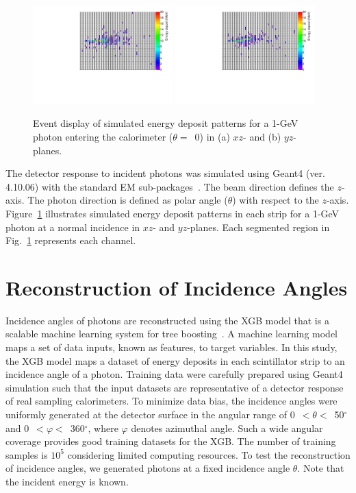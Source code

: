 \documentclass[preprint,12pt,times,a4paper]{elsarticle}
\begin{document}
\begin{figure}[!hbt]
\includegraphics[width=0.48\textwidth]{figures/SingleEventXZHit.pdf}
\includegraphics[width=0.48\textwidth]{figures/SingleEventYZHit.pdf}
\caption{ Event display of simulated energy deposit patterns for a 1-GeV photon entering the calorimeter ($\theta=$~0) in (a) $xz$- and (b) $yz$-planes.}
\label{fig:Evt_Dis}
\end{figure}

The detector response to incident photons was simulated using Geant4 (ver. 4.10.06) with the standard EM sub-packages~\cite{GEANT4}. The beam direction defines the $z$-axis. The photon direction is defined as polar angle ($\theta$) with respect to the $z$-axis. Figure~\ref{fig:Evt_Dis} illustrates simulated energy deposit patterns in each strip for a 1-GeV photon at a normal incidence in $xz$- and $yz$-planes. Each segmented region in Fig.~\ref{fig:Evt_Dis} represents each channel.

\section{Reconstruction of Incidence Angles}
\label{sec:res}

Incidence angles of photons are reconstructed using the XGB model that is a scalable machine learning system for tree boosting~\cite{xgboost:2016}. A machine learning model maps a set of data inputs, known as features, to target variables. In this study, the XGB model maps a dataset of energy deposits in each scintillator strip to an incidence angle of a photon. Training data were carefully prepared using Geant4 simulation such that the input datasets are representative of a detector response of real sampling calorimeters. To minimize 
data bias, the incidence angles were uniformly generated at the detector surface in the angular range of 0~$<\theta<$~50$^{\circ}$ and 0~$<\varphi<$~360$^{\circ}$, where $\varphi$ denotes azimuthal angle. Such a wide angular coverage provides good training datasets for the XGB. The number of training samples is $10^{5}$ considering limited computing resources. To test the reconstruction of incidence angles, we generated photons at a fixed incidence angle $\theta$. Note that the incident energy is known.
\end{document}
